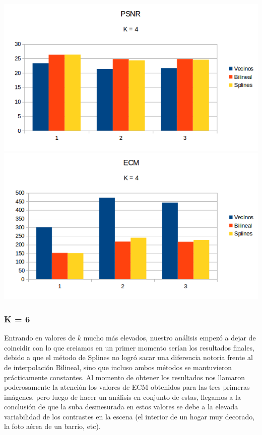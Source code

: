 \begin{center}
\includegraphics[scale=0.50]{imagenes/K4PSNR.png}
\includegraphics[scale=0.50]{imagenes/K4ECM.png}
\end{center}

\subsubsection{K = 6}
Entrando en valores de $k$ mucho más elevados, nuestro análisis empezó a dejar de coincidir con lo que creiamos en un primer momento serían los resultados finales, debido a que el método de Splines no logró sacar una diferencia notoria frente al de interpolación Bilineal, sino que incluso ambos métodos se mantuvieron prácticamente constantes.  Al momento de obtener los resultados nos llamaron poderosamente la atención los valores de ECM obtenidos para las tres primeras imágenes, pero luego de hacer un análisis en conjunto de estas, llegamos a la conclusión de que la suba desmesurada en estos valores se debe a la elevada variabilidad de los contrastes en la escena (el interior de un hogar muy decorado, la foto aérea de un barrio, etc). 

